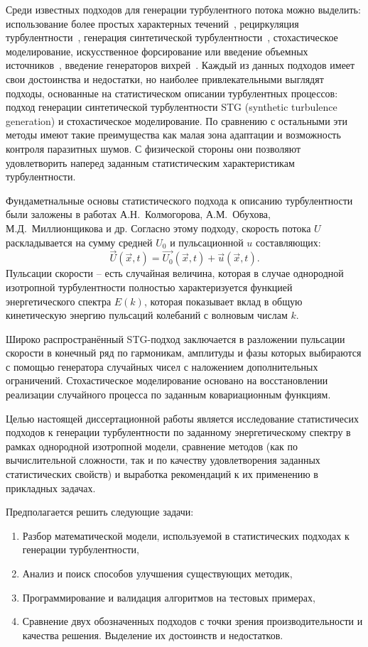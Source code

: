 Среди известных подходов для генерации турбулентного потока можно выделить:
использование более простых характерных течений~\cite{schluter2004large},
рециркуляция турбулентности~\cite{lund1998generation,spalart2006direct,shur2011rapid,araya2011dynamic},
генерация синтетической турбулентности~\cite{Kraichnan70,Smirnov2001,huang2010general,shur2014synthetic,adamian2011efficient,batten2004interfacing},
стохастическое моделирование,
искусственное форсирование или введение объемных источников~\cite{gritskevich2012embedded,spille2001generation},
введение генераторов вихрей~\cite{terracol2016investigation}.
Каждый из данных подходов имеет свои достоинства и недостатки, но наиболее привлекательными выглядят
подходы, основанные на статистическом описании турбулентных процессов:
подход генерации синтетической турбулентности STG (synthetic turbulence generation) и стохастическое моделирование.
По сравнению с остальными эти методы имеют такие преимущества как малая зона адаптации и возможность контроля паразитных шумов.
С физической стороны они позволяют удовлетворить наперед заданным статистическим характеристикам турбулентности.  

Фундаметнальные основы статистического подхода к описанию турбулентности были заложены в работах А.Н.~Колмогорова, А.М.~Обухова, М.Д.~Миллионщикова и др. 
Согласно этому подходу, скорость потока $U$ раскладывается на сумму средней $U_0$ и пульсационной $u$
составляющих:
$$\vec{U}\left(\vec{x}, t\right) = \vec{U_0}\left(\vec{x}, t\right)  + \vec{u}\left(\vec{x}, t\right).$$
Пульсации скорости -- есть случайная величина, которая в случае однородной изотропной
турбулентности полностью характеризуется функцией энергетического спектра $E(k)$,
которая показывает вклад в общую кинетическую энергию пульсаций колебаний с волновым числам $k$.

Широко распространённый STG-подход заключается в разложении пульсации скорости в конечный ряд по гармоникам,
амплитуды и фазы которых выбираются с помощью генератора случайных чисел с наложением дополнительных ограничений.
Стохастическое моделирование основано на восстановлении реализации случайного процесса по заданным ковариационным функциям.

Целью настоящей диссертационной работы является исследование статистичесих подходов к генерации турбулентности
по заданному энергетическому спектру в рамках однородной изотропной модели,
сравнение методов (как по вычислительной сложности, так и по качеству удовлетворения заданных статистических свойств) и 
выработка рекомендаций к их применению в прикладных задачах.

Предполагается решить следующие задачи:
\begin{enumerate}
	\item Разбор математической модели, используемой в статистических подходах к генерации турбулентности,
	\item Анализ и поиск способов улучшения существующих методик,
	\item Программирование и валидация алгоритмов на тестовых примерах,
	\item Сравнение двух обозначенных подходов с точки зрения производительности и качества решения. Выделение их достоинств и недостатков.
\end{enumerate}

